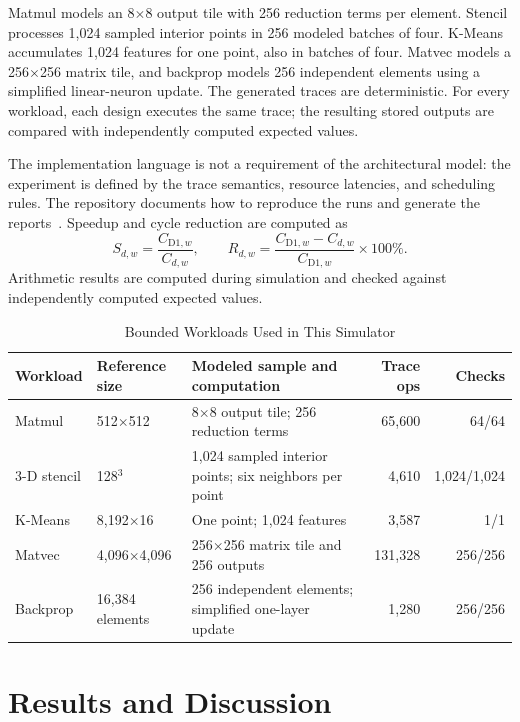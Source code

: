 \documentclass[conference]{IEEEtran}
\begin{document}
Matmul models an 8$\times$8 output tile with 256 reduction terms per element. Stencil processes 1,024 sampled interior points in 256 modeled batches of four. K-Means accumulates 1,024 features for one point, also in batches of four. Matvec models a 256$\times$256 matrix tile, and backprop models 256 independent elements using a simplified linear-neuron update. The generated traces are deterministic. For every workload, each design executes the same trace; the resulting stored outputs are compared with independently computed expected values.

The implementation language is not a requirement of the architectural model: the experiment is defined by the trace semantics, resource latencies, and scheduling rules. The repository documents how to reproduce the runs and generate the reports~\cite{repo}. Speedup and cycle reduction are computed as
\begin{equation}
S_{d,w}=\frac{C_{\mathrm{D1},w}}{C_{d,w}},\qquad
R_{d,w}=\frac{C_{\mathrm{D1},w}-C_{d,w}}{C_{\mathrm{D1},w}}\times100\%.
\label{eq:speed}
\end{equation}
Arithmetic results are computed during simulation and checked against independently computed expected values.

\begin{table}[t]
\caption{Bounded Workloads Used in This Simulator}
\label{tab:workloads}
\centering
\small
\begin{tabular}{@{}p{}p{}p{}rr@{}}
\toprule
Workload & Reference size~\cite{pipeimc} & Modeled sample and computation & Trace ops & Checks\\
\midrule
Matmul & 512$\times$512 & 8$\times$8 output tile; 256 reduction terms & 65,600 & 64/64\\
3-D stencil & 128$^3$ & 1,024 sampled interior points; six neighbors per point & 4,610 & 1,024/1,024\\
K-Means & 8,192$\times$16 & One point; 1,024 features & 3,587 & 1/1\\
Matvec & 4,096$\times$4,096 & 256$\times$256 matrix tile and 256 outputs & 131,328 & 256/256\\
Backprop & 16,384 elements & 256 independent elements; simplified one-layer update & 1,280 & 256/256\\
\bottomrule
\end{tabular}
\end{table}

\section{Results and Discussion}
\end{document}
